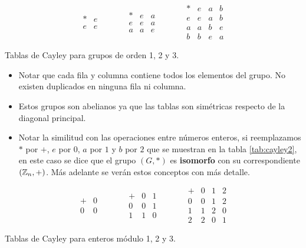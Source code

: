 \begin{table}[H]
	\centering
	\[ \begin{array}{c|c}
		* & e \\ \hline
		e & e
	\end{array} \qquad \quad \begin{array}{c|cc}
		* & e & a \\ \hline
		e & e & a \\
		a & a & e
	\end{array} \qquad \quad \begin{array}{c|ccc}
		* & e & a & b \\ \hline
		e & e & a & b \\
		a & a & b & e \\
		b & b & e & a
	\end{array}\]
	\caption{Tablas de Cayley para grupos de orden 1, 2 y 3.}
	\label{tab:cayley}
\end{table}
\begin{itemize}
	\item Notar que cada fila y columna contiene todos los elementos del grupo. No existen duplicados en ninguna fila ni columna.
	
	\item Estos grupos son abelianos ya que las tablas son simétricas respecto de la diagonal principal.
	\item Notar la similitud con las operaciones entre números enteros, si reemplazamos $*$ por $+$, $e$ por $0$, $a$ por $1$ y $b$ por $2$ que se muestran en la tabla \ref{tab:cayley2}, en este caso se dice que el grupo $(G, *)$ es \textbf{isomorfo} con su correspondiente $(\mathbb{Z}_n, +)$. Más adelante se verán estos conceptos con más detalle.
\end{itemize}

\begin{table}[H]
	\centering
	\[ \begin{array}{c|c}
		+ & 0 \\ \hline
		0 & 0
	\end{array} \qquad \quad \begin{array}{c|cc}
		+ & 0 & 1 \\ \hline
		0 & 0 & 1 \\
		1 & 1 & 0
	\end{array} \qquad \quad \begin{array}{c|ccc}
		+ & 0 & 1 & 2 \\ \hline
		0 & 0 & 1 & 2 \\
		1 & 1 & 2 & 0 \\
		2 & 2 & 0 & 1
	\end{array}\]
	\caption{Tablas de Cayley para enteros módulo 1, 2 y 3.}
	\label{tab:cayley2}
\end{table}

